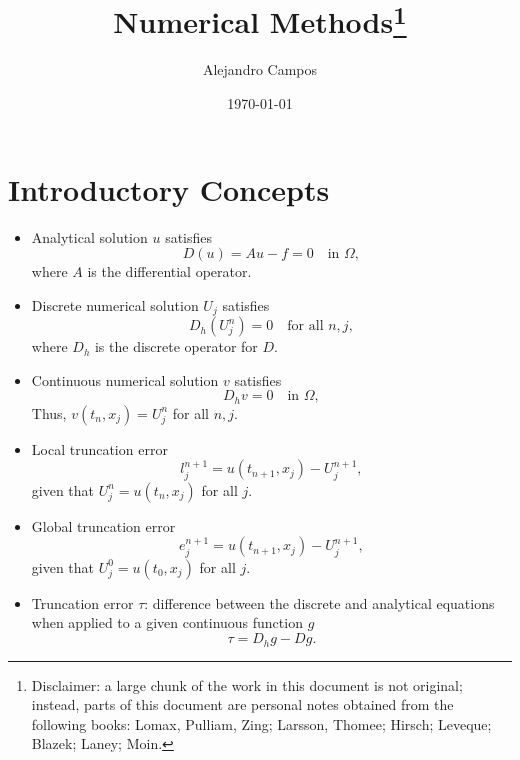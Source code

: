 \documentclass[oneside,a4paper,11pt]{report}
\title{Numerical Methods\thanks{Disclaimer: a large chunk of the work in this document is not original; instead, parts of this document are personal notes obtained from the following books: Lomax, Pulliam, Zing; Larsson, Thomee; Hirsch; Leveque; Blazek; Laney; Moin.}}
\date{\today}
\author{Alejandro Campos}
\begin{document}
\maketitle
\tableofcontents

\part{Introductory Concepts}
\begin{itemize}
\item Analytical solution $u$ satisfies
\begin{equation}
D(u) = Au - f = 0\quad \text{in } \Omega,
\label{pde}
\end{equation}
where $A$ is the differential operator.

\item Discrete numerical solution $U_j$ satisfies 
\begin{equation}
D_h(U^n_j) = 0 \quad \text{for all } n, j ,
\end{equation}
where $D_h$ is the discrete operator for $D$.

\item Continuous numerical solution $v$ satisfies
\begin{equation}
D_hv = 0 \quad \text{in } \Omega,
\label{npde}
\end{equation}
Thus, $v(t_n, x_j) = U^n_j$ for all $n, j$.

\item Local truncation error 
\begin{equation}
l^{n+1}_j = u(t_{n+1}, x_j) - U^{n+1}_j,
\end{equation}
given that $U^n_j = u(t_n, x_j)$ for all $j$. 

\item Global truncation error
\begin{equation}
e^{n+1}_j = u(t_{n+1}, x_j) - U^{n+1}_j,
\end{equation}
given that $U^0_j = u(t_0, x_j)$ for all $j$.

\item Truncation error $\tau$: difference between the discrete and analytical equations when applied to a given continuous function $g$
\begin{equation}
\tau = D_hg - Dg.
\label{trunc}
\end{equation}


\end{itemize}
\end{document}
